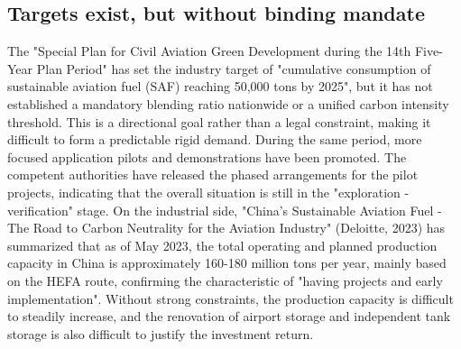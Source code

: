 \documentclass[a4paper,11pt]{article}
\begin{document}
\subsection{Targets exist, but without binding mandate}
The "Special Plan for Civil Aviation Green Development during the 14th Five-Year Plan Period" has set the industry target of "cumulative consumption of sustainable aviation fuel (SAF) reaching 50,000 tons by 2025", but it has not established a mandatory blending ratio nationwide or a unified carbon intensity threshold. This is a directional goal rather than a legal constraint, making it difficult to form a predictable rigid demand. During the same period, more focused application pilots and demonstrations have been promoted. The competent authorities have released the phased arrangements for the pilot projects, indicating that the overall situation is still in the "exploration - verification" stage. On the industrial side, "China's Sustainable Aviation Fuel - The Road to Carbon Neutrality for the Aviation Industry" (Deloitte, 2023) has summarized that as of May 2023, the total operating and planned production capacity in China is approximately 160-180 million tons per year, mainly based on the HEFA route, confirming the characteristic of "having projects and early implementation". Without strong constraints, the production capacity is difficult to steadily increase, and the renovation of airport storage and independent tank storage is also difficult to justify the investment return.
\end{document}
